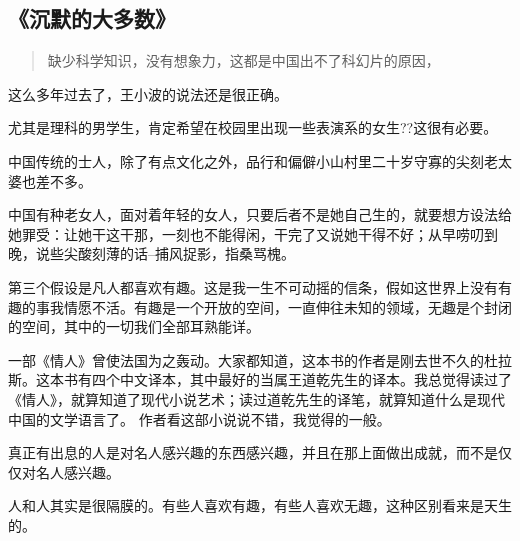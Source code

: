 \subsection{《沉默的大多数》}

\begin{quotation}
缺少科学知识，没有想象力，这都是中国出不了科幻片的原因，
\end{quotation}
这么多年过去了，王小波的说法还是很正确。

尤其是理科的男学生，肯定希望在校园里出现一些表演系的女生??这很有必要。

中国传统的士人，除了有点文化之外，品行和偏僻小山村里二十岁守寡的尖刻老太婆也差不多。

中国有种老女人，面对着年轻的女人，只要后者不是她自己生的，就要想方设法给她罪受：让她干这干那，一刻也不能得闲，干完了又说她干得不好；从早唠叨到晚，说些尖酸刻薄的话--捕风捉影，指桑骂槐。

第三个假设是凡人都喜欢有趣。这是我一生不可动摇的信条，假如这世界上没有有趣的事我情愿不活。有趣是一个开放的空间，一直伸往未知的领域，无趣是个封闭的空间，其中的一切我们全部耳熟能详。

一部《情人》曾使法国为之轰动。大家都知道，这本书的作者是刚去世不久的杜拉斯。这本书有四个中文译本，其中最好的当属王道乾先生的译本。我总觉得读过了《情人》，就算知道了现代小说艺术；读过道乾先生的译笔，就算知道什么是现代中国的文学语言了。
作者看这部小说说不错，我觉得的一般。

真正有出息的人是对名人感兴趣的东西感兴趣，并且在那上面做出成就，而不是仅仅对名人感兴趣。

人和人其实是很隔膜的。有些人喜欢有趣，有些人喜欢无趣，这种区别看来是天生的。